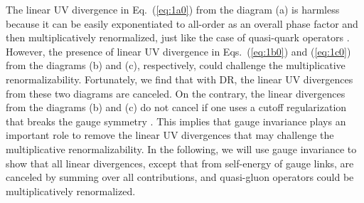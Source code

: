 The linear UV divergence in Eq.~(\ref{eq:1a0}) from the diagram (a) is harmless because it can be easily exponentiated to all-order as an overall phase factor and then multiplicatively renormalized, just like the case of quasi-quark operators \cite{Ishikawa:2017faj,Polyakov:1980ca,Dotsenko:1979wb}. However, the presence of linear UV divergence in Eqs.~(\ref{eq:1b0}) and (\ref{eq:1c0}) from the diagrams (b) and (c), respectively, could challenge the multiplicative renormalizability. Fortunately, we find that with DR, the linear UV divergences from these two diagrams are canceled.  On the contrary, the linear divergences from the diagrams (b) and (c) do not cancel if one uses a cutoff regularization that breaks the gauge symmetry \cite{Wang:2017qyg,Wang:2017eel}. This implies that gauge invariance plays an important role to remove the linear UV divergences that may challenge the multiplicative renormalizability.  In the following, we will use gauge invariance to show that all linear divergences, except that from self-energy of gauge links, are canceled by summing over all contributions, and quasi-gluon operators could be multiplicatively renormalized.
